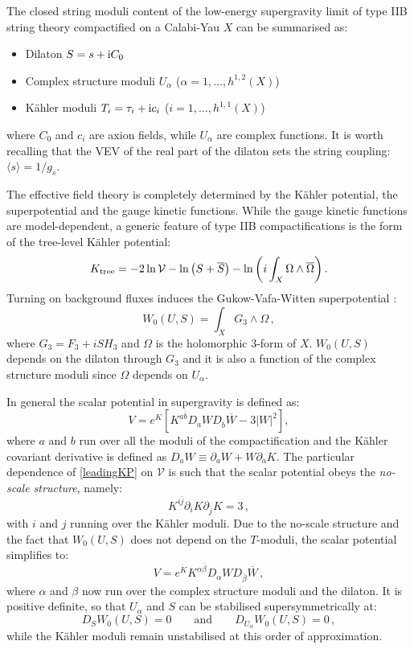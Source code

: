 \documentclass[11pt,a4paper]{article}
\newcommand{\be}{\begin{equation}}
\newcommand{\ee}{\end{equation}}
\newcommand\vo{{\mathcal{V}}}
\begin{document}
The closed string moduli content of the low-energy supergravity limit of type IIB string theory compactified on a Calabi-Yau $X$ can be summarised as:
\begin{itemize}
\item Dilaton $S = s + {\rm i} C_0$
\item Complex structure moduli $U_\alpha$ ($\alpha = 1, \dots, h^{1,2}(X)$)
\item K\"ahler moduli $T_i = \tau_i + {\rm i} c_i$ ($i = 1, \dots, h^{1,1}(X)$)
\end{itemize}
where $C_0$ and $c_i$ are axion fields, while $U_\alpha$ are complex functions. It is worth recalling that the VEV of the real part of the dilaton sets the string coupling: $\langle s\rangle = 1/g_s$.

The effective field theory is completely determined by the K\"ahler potential, the superpotential and the gauge kinetic functions. While the gauge kinetic functions are model-dependent, a generic feature of type IIB compactifications is the form of the tree-level K\"ahler potential:
\be
K_{\rm tree} = - 2 \ln\vo - \ln\left(S + \overline{S}\right) - \ln\left(i \int_X \Omega \wedge \overline{\Omega}\right).
\label{leadingKP}
\ee
Turning on background fluxes induces the Gukow-Vafa-Witten superpotential \cite{Gukov:1999ya}:
\be
W_0(U,S) = \int_X G_3 \wedge \Omega\,,
\ee
where $G_3 = F_3 + i S H_3$ and $\Omega$ is the holomorphic 3-form of $X$. $W_0(U,S)$ depends on the dilaton through $G_3$ and it is also a function of the complex structure moduli since $\Omega$ depends on $U_\alpha$.

In general the scalar potential in supergravity is defined as:
\be
V = e^K \left[K^{a \bar{b}} D_a W D_{\bar{b}} \overline{W} - 3 |W|^2 \right],
\ee
where $a$ and $b$ run over all the moduli of the compactification and the K\"ahler covariant derivative is defined as $D_a W\equiv\partial_a W+ W \partial_a K$. The particular dependence of \eqref{leadingKP} on $\vo$ is such that the scalar potential obeys the \textit{no-scale structure}, namely:
\be
K^{i \bar{j}} \partial_i K \partial_{\bar{j}} K =  3 \,,
\ee
with $i$ and $j$ running over the K\"ahler moduli. Due to the no-scale structure and the fact that $W_0(U,S)$ does not depend on the $T$-moduli, the scalar potential simplifies to:
\be
V = e^K K^{\alpha \bar{\beta}} D_\alpha W D_{\bar{\beta}} \overline{W}\,,
\ee
where $\alpha$ and $\beta$ now run over the complex structure moduli and the dilaton. It is positive definite, so that $U_\alpha$ and $S$ can be stabilised supersymmetrically at:
\be
D_S W_0(U,S) = 0 \qquad\text{and}\qquad D_{U_{\alpha}} W_0(U,S) = 0\,,
\label{sustabilisation}
\ee
while the K\"ahler moduli remain unstabilised at this order of approximation.
\end{document}
